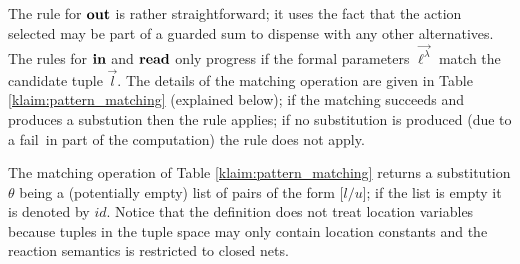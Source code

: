 \documentclass[a4paper]{llncs}
\newcommand{\YZl}{l}
\newcommand{\Fail}{{\sf fail}}
\newcommand{\Lat}{\ell^\lambda}
\newcommand{\veck}[1]{\overrightarrow{#1}}
\begin{document}
The rule for ${\bf out}$ is rather straightforward; it uses the fact
that the action selected may be part of a guarded sum to dispense with
any other alternatives. The rules for ${\bf in}$ and ${\bf read}$ only
progress if the formal parameters $\veck{\Lat}$ match the candidate
tuple $\veck{\YZl}$. The details of the matching operation are given
in Table \ref{klaim:pattern_matching} (explained below); if the
matching succeeds and produces a substution then the rule applies; if
no substitution is produced (due to a \Fail\ in part of the
computation) the rule does not apply.

The matching operation of Table \ref{klaim:pattern_matching} returns a
substitution $\theta$ being a (potentially empty) list of pairs of the
form [$l/u$]; if the list is empty it is denoted by $id$. Notice that
the definition does not treat location variables because tuples in the
tuple space may only contain location constants and the reaction
semantics is restricted to closed nets. 
\end{document}
